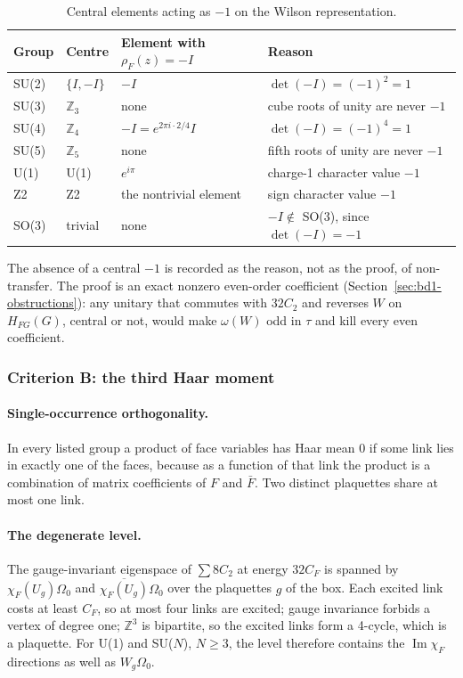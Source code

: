 \begin{table}[htbp]
\centering\small
\caption{Central elements acting as $-1$ on the Wilson representation.}
\label{tab:bd1-centre}
\begin{tabular}{llll}
\toprule
Group & Centre & Element with $\rho_F(z)=-I$ & Reason\\
\midrule
SU(2) & $\{I,-I\}$ & $-I$ & $\det(-I)=(-1)^2=1$\\
SU(3) & $\mathbb Z_3$ & none & cube roots of unity are never $-1$\\
SU(4) & $\mathbb Z_4$ & $-I=e^{2\pi i\cdot2/4}I$ & $\det(-I)=(-1)^4=1$\\
SU(5) & $\mathbb Z_5$ & none & fifth roots of unity are never $-1$\\
U(1) & U(1) & $e^{i\pi}$ & charge-1 character value $-1$\\
Z2 & Z2 & the nontrivial element & sign character value $-1$\\
SO(3) & trivial & none & $-I\notin$ SO(3), since $\det(-I)=-1$\\
\bottomrule
\end{tabular}
\end{table}

The absence of a central $-1$ is recorded as the reason, not as the proof,
of non-transfer. The proof is an exact nonzero even-order coefficient
(Section~\ref{sec:bd1-obstructions}): any unitary that commutes with $32C_2$
and reverses $W$ on $H_{FG}(G)$, central or not, would make $\omega(W)$ odd in
$\tau$ and kill every even coefficient.

\subsubsection{Criterion B: the third Haar moment}
\label{sec:bd1-parity}
\paragraph{Single-occurrence orthogonality.} In every listed group a product
of face variables has Haar mean 0 if some link lies in exactly one of the
faces, because as a function of that link the product is a combination of
matrix coefficients of $F$ and $\bar F$. Two distinct plaquettes share at most
one link.

\paragraph{The degenerate level.} The gauge-invariant eigenspace of
$\sum8C_2$ at energy $32C_F$ is spanned by $\chi_F(U_g)\Omega_0$ and
$\overline{\chi_F(U_g)}\Omega_0$ over the plaquettes $g$ of the box. Each
excited link costs at least $C_F$, so at most four links are excited; gauge
invariance forbids a vertex of degree one; $\mathbb Z^3$ is bipartite, so the
excited links form a 4-cycle, which is a plaquette. For U(1) and SU($N$),
$N\ge3$, the level therefore contains the $\operatorname{Im}\chi_F$
directions as well as $W_g\Omega_0$.

